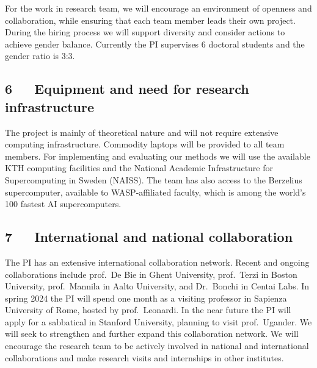 \documentclass[a4paper,11pt]{article}
\begin{document}
For the work in research team, 
we will encourage an environment of openness and collaboration, 
while ensuring that each team member leads their own project.
%
During the hiring process we will support diversity and consider actions to achieve gender balance. 
Currently the PI supervises 6 doctoral students and the gender ratio is 3:3.




\subsection*{6~~~Equipment and need for research infrastructure}


The project is mainly of theoretical nature and will not require extensive computing infrastructure. 
Commodity laptops will be provided to all team members. 
For implementing and evaluating our methods we will use the available 
KTH computing facilities
and the National Academic Infrastructure for Supercomputing in Sweden (NAISS).
The team has also access to the Berzelius supercomputer, 
available to WASP-affiliated faculty, 
which is among the world's 100 fastest AI supercomputers.

\subsection*{7~~~International and national collaboration}


The PI has an extensive international collaboration network. 
Recent and ongoing collaborations include
prof.\ De Bie in Ghent University, 
prof.\ Terzi in Boston University,
prof.\ Mannila in Aalto University, and 
Dr.\ Bonchi in Centai Labs.
In spring 2024 the PI will spend one month as a visiting professor 
in Sapienza University of Rome, hosted by prof.\ Leonardi.
In the near future the PI will apply for a sabbatical in Stanford University, 
planning to visit prof.\ Ugander. 
We will seek to strengthen and further expand this collaboration network.
We will encourage the research team to be actively involved in national and international collaborations
and make research visits and internships in other institutes.
\end{document}
